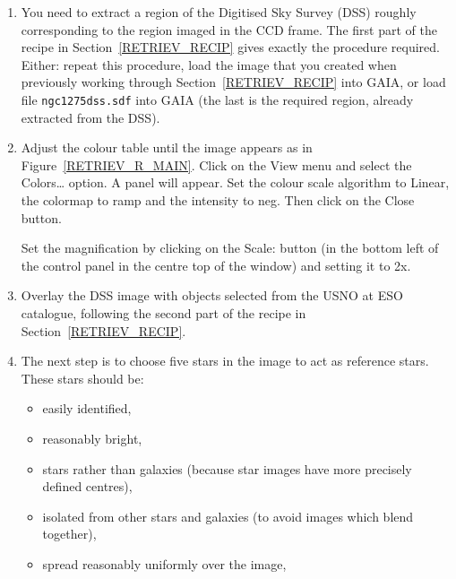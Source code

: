 \documentclass[twoside,11pt]{starlink}
\begin{document}
\begin{enumerate}

  \item You need to extract a region of the Digitised Sky Survey (DSS)
   roughly corresponding to the region imaged in the CCD frame.  The
   first part of the recipe in Section~\ref{RETRIEV_RECIP} gives exactly
   the procedure required.  Either: repeat this procedure, load the image
   that you created when previously working through
   Section~\ref{RETRIEV_RECIP} into GAIA, or load file \texttt{ngc1275dss.sdf}
   into GAIA (the last is the required region, already extracted from
   the DSS).

  \item Adjust the colour table until the image appears as in
   Figure~\ref{RETRIEV_R_MAIN}.  Click on the \textsf{View} menu and select
   the \textsf{Colors\ldots} option.  A panel will appear.  Set the colour
   scale algorithm to \textsf{Linear}, the colormap to \textsf{ramp} and the
   intensity to \textsf{neg}.  Then click on the \textsf{Close} button.

   Set the magnification by clicking on the \textsf{Scale:} button (in the
   bottom left of the control panel in the centre top of the window) and
   setting it to \textsf{2x}.

  \item Overlay the DSS image with objects selected from the \textsf{USNO at
   ESO} catalogue, following the second part of the recipe in
   Section~\ref{RETRIEV_RECIP}.

  \item The next step is to choose five stars in the image to act as
   reference stars.  These stars should be:

  \begin{itemize}

    \item easily identified,

    \item reasonably bright,

    \item stars rather than galaxies (because star images have more
     precisely defined centres),

    \item isolated from other stars and galaxies (to avoid images which
     blend together),

    \item spread reasonably uniformly over the image,


\end{itemize}
\end{enumerate}
\end{document}
